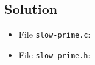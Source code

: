 
\subsection*{Solution}

\lstset{language=c,tabsize=4}
\begin{itemize}
\item[] File \texttt{slow-prime.c}:

\newpage
\item[] File \texttt{slow-prime.h}:

\end{itemize}
